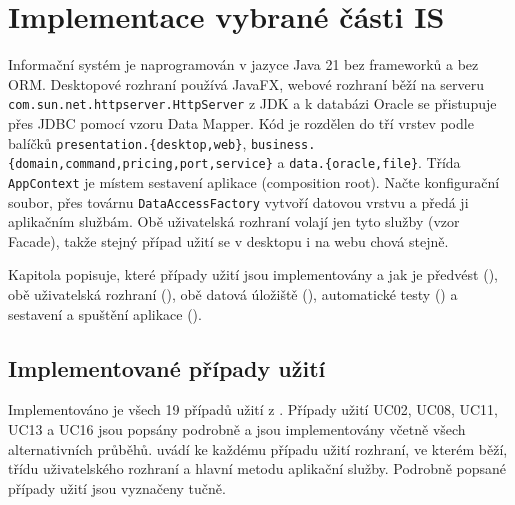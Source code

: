 \section{Implementace vybrané části IS}\label{sec:impl}
\begingroup\sloppy

Informační systém je naprogramován v jazyce Java 21 bez frameworků a bez ORM. Desktopové rozhraní používá JavaFX, webové rozhraní běží na serveru \texttt{com.sun.net.httpserver.HttpServer} z JDK a k databázi Oracle se přistupuje přes JDBC pomocí vzoru Data Mapper. Kód je rozdělen do tří vrstev podle balíčků \texttt{presentation.\{desktop,web\}}, \texttt{business.\{domain,command,pricing,port,service\}} a \texttt{data.\{oracle,file\}}. Třída \texttt{AppContext} je místem sestavení aplikace (composition root). Načte konfigurační soubor, přes továrnu \texttt{DataAccessFactory} vytvoří datovou vrstvu a předá ji aplikačním službám. Obě uživatelská rozhraní volají jen tyto služby (vzor Facade), takže stejný případ užití se v desktopu i na webu chová stejně.

Kapitola popisuje, které případy užití jsou implementovány a jak je předvést (), obě uživatelská rozhraní (), obě datová úložiště (), automatické testy () a sestavení a spuštění aplikace ().

\subsection{Implementované případy užití}\label{sec:impl:uc}

Implementováno je všech 19 případů užití z . Případy užití UC02, UC08, UC11, UC13 a UC16 jsou popsány podrobně a jsou implementovány včetně všech alternativních průběhů.  uvádí ke každému případu užití rozhraní, ve kterém běží, třídu uživatelského rozhraní a hlavní metodu aplikační služby. Podrobně popsané případy užití jsou vyznačeny tučně.


